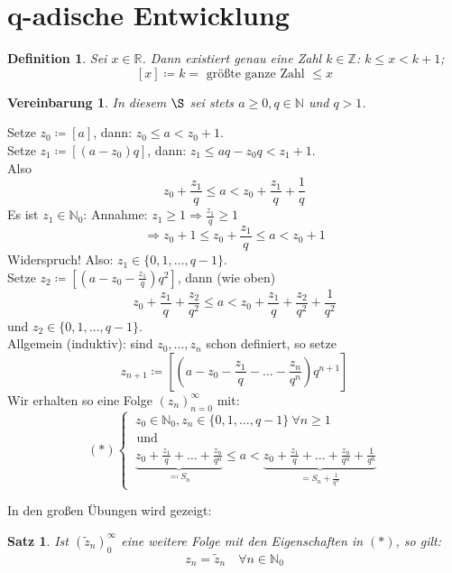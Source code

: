 \documentclass[titlepage,ngerman,a4paper,headsepline]{scrartcl}
\newcommand{\N}{\mathbb{N}}
\newcommand{\R}{\mathbb{R}}
\newcommand{\Z}{\mathbb{Z}}
\theoremstyle{named}
\theoremstyle{dotless}
\newtheorem{satz}[namedtheorem]{Satz}
\newtheorem*{definition}{Definition}
\newtheorem*{vereinbarung}{Vereinbarung}
\begin{document}
\newpage


\section{q-adische Entwicklung}

\begin{definition}
	Sei $x \in \R$. Dann existiert genau eine Zahl $k \in \Z$: $k \leq x < k + 1$; 
		$$ [x] \coloneqq k = \text{ grö{\ss}te ganze Zahl } \leq x $$
\end{definition}


\begin{vereinbarung}
	In diesem $\S$ sei stets $a \geq 0, q \in \N$ und $q > 1$.
\end{vereinbarung}


Setze $z_{0} \coloneqq [a]$, dann: $z_{0} \leq a < z_{0} + 1$. \\
Setze $z_{1} \coloneqq [(a-z_{0})q]$, dann: $z_{1} \leq aq - z_{0}q < z_{1} + 1$. \\
Also
	$$ z_{0} + \frac{z_{1}}{q} \leq a < z_{0} + \frac{z_{1}}{q} + \frac{1}{q} $$
Es ist $z_{1} \in \N_{0}$: Annahme: $z_{1} \geq 1 \Rightarrow \frac{z_{1}}{q} \geq 1$
	$$ \Rightarrow z_{0} + 1 \leq z_{0} + \frac{z_{1}}{q} \leq a < z_{0} +1 $$
Widerspruch! Also: $z_{1} \in \{ 0, 1, \dotsc, q - 1 \}$. \\
Setze  $z_{2} \coloneqq [(a-z_{0}-\frac{z_{1}}{q})q^{2}]$, dann (wie oben)
	$$ z_{0} + \frac{z_{1}}{q} + \frac{z_{2}}{q^{2}} \leq a < z_{0} + \frac{z_{1}}{q} + \frac{z_{2}}{q^{2}} + \frac{1}{q^{2}} $$
und $z_{2} \in \{ 0, 1, \dotsc, q - 1 \}$. \\
Allgemein (induktiv): sind $z_{0}, \dotsc, z_{n}$ schon definiert, so setze
	$$ z_{n+1} \coloneqq [(a - z_{0} - \frac{z_{1}}{q} - \dotsc - \frac{z_{n}}{q^{n}}) q^{n+1}] $$
Wir erhalten so eine Folge $(z_{n})_{n=0}^{\infty}$ mit:
	$$ (*) \begin{cases} ~ z_{0} \in \N_{0}, z_{n} \in \{ 0, 1, \dotsc, q - 1 \} ~\forall n \geq 1 \\ \text{ und} \\ ~\underbrace{z_{0} + \frac{z_{1}}{q} + \dotsc + \frac{z_{n}}{q^{n}}}_{\eqqcolon S_{n}} \leq a < \underbrace{ z_{0} + \frac{z_{1}}{q} + \dotsc + \frac{z_{n}}{q^{n}} + \frac{1}{q^{n}}}_{= S_{n} + \frac{1}{q^{n}}} \end{cases} $$


In den gro{\ss}en Übungen wird gezeigt:

\begin{satz} \label{5.1:satz}
	Ist $(\tilde{z}_{n})_{0}^{\infty}$ eine weitere Folge mit den Eigenschaften in $(*)$, so gilt: 
	$$ z_{n} = \tilde{z}_{n} \quad \forall n \in \N_{0} $$
\end{satz}
\end{document}
